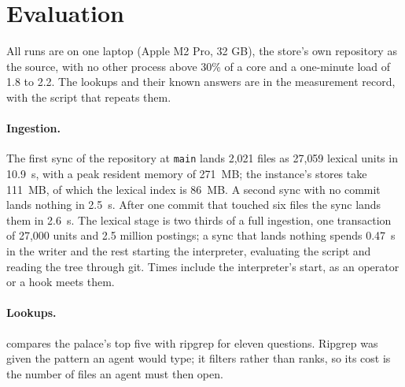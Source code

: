 \documentclass[11pt]{article}
\theoremstyle{plain}
\theoremstyle{definition}
\theoremstyle{remark}
\newcommand{\code}[1]{\texttt{#1}}
\newcommand{\nfiles}{2{,}021}
\newcommand{\nunits}{27{,}059}
\newcommand{\tfull}{10.9}
\newcommand{\rssfull}{271}
\newcommand{\storemb}{111}
\newcommand{\lexmb}{86}
\newcommand{\tnoop}{2.5}
\newcommand{\tincr}{2.6}
\newcommand{\nchanged}{six}
\newcommand{\runload}{with no other process above 30\% of a core and a one-minute load of 1.8 to 2.2}
\begin{document}
\section{Evaluation}\label{sec:eval}

All runs are on one laptop (Apple M2 Pro, 32 GB), the store's own repository as the source,
\runload{}. The lookups and their known answers are in the measurement record, with the
script that repeats them.

\paragraph{Ingestion.} The first sync of the repository at \code{main} lands \nfiles{} files as
\nunits{} lexical units in \tfull{}~s, with a peak resident memory of \rssfull{}~MB; the
instance's stores take \storemb{}~MB, of which the lexical index is \lexmb{}~MB. A second sync with
no commit lands nothing in \tnoop{}~s. After one commit that touched \nchanged{} files the sync
lands them in \tincr{}~s. The lexical stage is two thirds of a full ingestion, one transaction of
27{,}000 units and 2.5 million postings; a sync that lands nothing spends 0.47~s in the writer and
the rest starting the interpreter, evaluating the script and reading the tree through git. Times
include the interpreter's start, as an operator or a hook meets them.

\paragraph{Lookups.}  compares the palace's top five with ripgrep for eleven
questions. Ripgrep was given the pattern an agent would type; it filters rather than ranks, so its
cost is the number of files an agent must then open.
\end{document}
